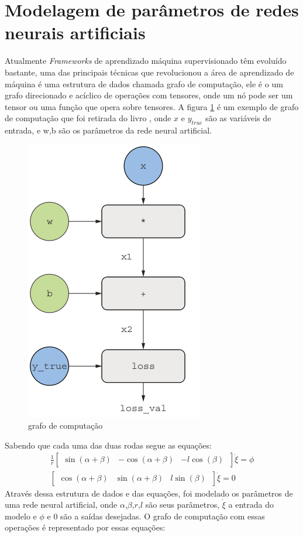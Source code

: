 \section{Modelagem de parâmetros de redes neurais artificiais}
Atualmente \textit{Frameworks} de aprendizado máquina supervisionado
têm evoluído bastante, uma das principais técnicas que revolucionou a
área de aprendizado de máquina é uma estrutura de dados chamada grafo
de computação, ele é o um grafo direcionado e acíclico de operações com
tensores, onde um nó pode ser um tensor ou uma função que opera sobre
tensores. A figura \ref{fig:grafo:computacional} é um exemplo de
grafo de computação que foi retirada do livro \cite{chollet2021deep},
onde $x$ e $y_{true}$ são as variáveis de entrada, e w,b são
os parâmetros da rede neural artificial. 

\begin{figure}[H]
    \label{fig:grafo:computacional}
    \centering
    \includegraphics[scale=0.5]{figuras/grafo_computacional.png}
    \caption{grafo de computação}
\end{figure}

Sabendo que cada uma das duas rodas segue as equações:
\begin{align}
    \frac{1}{r}
    \begin{bmatrix}
        \sin(\alpha + \beta) &  -\cos(\alpha + \beta) & -l\cos(\beta) \
    \end{bmatrix}
    \dot{\xi}
    = \phi \\
    \begin{bmatrix}
        \cos(\alpha + \beta) &  \sin(\alpha + \beta) & l\sin(\beta) \
    \end{bmatrix}
    \dot{\xi}
    = 0 
\end{align}
Através dessa estrutura de dados e das equações, foi
modelado os parâmetros de uma rede neural artificial,
onde $\alpha$,$\beta$,$r$,$l$ são seus parâmetros,
$\dot{\xi}$ a entrada do modelo e $\phi$ e $0$  são a saídas desejadas.
O grafo de computação com essas operações é representado por essas equações:

